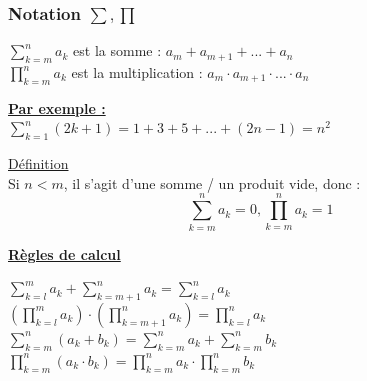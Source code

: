 \documentclass[12pt,a4paper]{article}
\newcommand{\somme}[2]{\ensuremath{\sum\limits_{#2}^{#1}}}
\newcommand{\produit}[2]{\ensuremath{\prod\limits_{#2}^{#1}}}
\newcommand{\evid}[1]{\textbf{\underline{#1}}}
\newcommand{\Definition}{\underline{Définition} }
\begin{document}
\subsubsection{Notation $\sum, \prod$}
\begin{boite}
	$\somme{n}{k=m}a_k$ est la somme : $a_m + a_{m+1} +...+a_n$\\
	$\produit{n}{k=m}a_k$ est la multiplication : $a_m \cdot a_{m+1} \cdot... \cdot a_n$\\
\end{boite}
\evid{Par exemple :}\\
$\somme{n}{k=1}(2k+1) = 1 + 3 + 5 +... + (2n-1) = n^2$
\begin{boite}
	\Definition \\
	Si $n < m$, il s'agit d'une somme / un produit vide, donc :
	\begin{equation}
		\sum^{n}_{k=m}a_k = 0, \prod^{n}_{k=m}a_k = 1
	\end{equation}
\end{boite}

\evid{Règles de calcul}
\begin{center}
	$\somme{m}{k=l}a_k + \somme{n}{k=m+1}a_k = \somme{n}{k=l}a_k$\\	
	$\left(\produit{m}{k=l}a_k\right)\cdot\left(\produit{n}{k=m+1}a_k\right) = \produit{n}{k=l}a_k$\\
	$\somme{n}{k=m}(a_k + b_k) = \somme{n}{k=m}a_k + \somme{n}{k=m}b_k$\\
	$\produit{n}{k=m}(a_k\cdot b_k) = \produit{n}{k=m}a_k \cdot \produit{n}{k=m}b_k$
\end{center}
\end{document}
